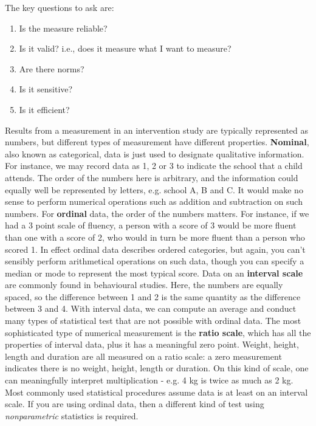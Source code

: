 \documentclass{krantz}
\providecommand{\tightlist}{%
\setlength{\itemsep}{0pt}\setlength{\parskip}{0pt}}
\begin{document}
The key questions to ask are:

\begin{enumerate}
\def\labelenumi{\arabic{enumi}.}
\tightlist
\item
  Is the measure reliable?
\item
  Is it valid? i.e., does it measure what I want to measure?
\item
  Are there norms?
\item
  Is it sensitive?
\item
  Is it efficient?
\end{enumerate}

\begin{tcolorbox}[colback=Black!5!lightgray,colframe=black!75!black,coltitle=white,title=Types of numerical measurement]\label{box:numerical}
Results from a measurement in an intervention study are typically represented as numbers, but different types of measurement have different properties. \textbf{Nominal}, also known as categorical, data is just used to designate qualitative information. For instance, we may record data as 1, 2 or 3 to indicate the school that a child attends. The order of the numbers here is arbitrary, and the information could equally well be represented by letters, e.g. school A, B and C. It would make no sense to perform numerical operations such as addition and subtraction on such numbers.  
For \textbf{ordinal} data, the order of the numbers matters. For instance, if we had a 3 point scale of fluency, a person with a score of 3 would be more fluent than one with a score of 2, who would in turn be more fluent than a person who scored 1. In effect ordinal data describes ordered categories, but again, you can't sensibly perform arithmetical operations on such data, though you can specify a median or mode to represent the most typical score.   
Data on an \textbf{interval scale}  are commonly found in behavioural studies. Here, the numbers are equally spaced, so the difference between 1 and 2 is the same quantity as the difference between 3 and 4. With interval data, we can compute an average and conduct many types of statistical test that are not possible with ordinal data.  
The most sophisticated type of numerical measurement is the \textbf{ratio scale}, which has all the properties of interval data, plus it has a meaningful zero point. Weight, height, length and duration are all measured on a ratio scale: a zero measurement indicates there is no weight, height, length or duration. On this kind of scale, one can meaningfully interpret multiplication - e.g. 4 kg is twice as much as 2 kg. 
Most commonly used statistical procedures assume data is at least on an interval scale. If you are using ordinal data, then a different kind of test using \textit{nonparametric} statistics is required.
\end{tcolorbox}
\end{document}
